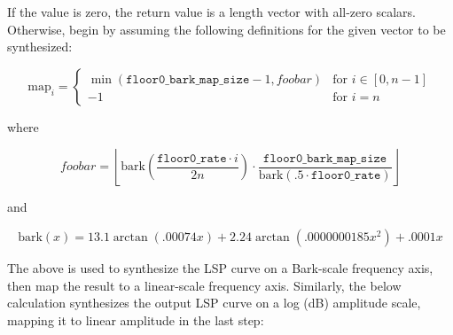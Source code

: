 If the value \varname{[amplitude]} is zero, the return value is a
length \varname{[n]} vector with all-zero scalars.  Otherwise, begin by
assuming the following definitions for the given vector to be
synthesized:

   \begin{displaymath}
     \mathrm{map}_i = \left\{
       \begin{array}{ll}
          \min (
            \mathtt{floor0\texttt{\_}bark\texttt{\_}map\texttt{\_}size} - 1,
            foobar
          ) & \textrm{for } i \in [0,n-1] \\
          -1 & \textrm{for } i = n
        \end{array}
      \right.
    \end{displaymath}

    where

    \begin{displaymath}
    foobar =
      \left\lfloor
        \mathrm{bark}\left(\frac{\mathtt{floor0\texttt{\_}rate} \cdot i}{2n}\right) \cdot \frac{\mathtt{floor0\texttt{\_}bark\texttt{\_}map\texttt{\_}size}} {\mathrm{bark}(.5 \cdot \mathtt{floor0\texttt{\_}rate})}
      \right\rfloor
    \end{displaymath}

    and

    \begin{displaymath}
      \mathrm{bark}(x) = 13.1 \arctan (.00074x) + 2.24 \arctan (.0000000185x^2) + .0001x
    \end{displaymath}

The above is used to synthesize the LSP curve on a Bark-scale frequency
axis, then map the result to a linear-scale frequency axis.
Similarly, the below calculation synthesizes the output LSP curve \varname{[output]} on a log
(dB) amplitude scale, mapping it to linear amplitude in the last step:

